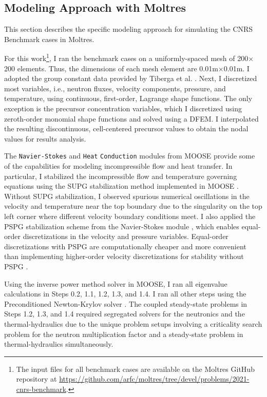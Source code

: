 \subsection{Modeling Approach with Moltres} \label{sec:model}

This section describes the specific modeling approach for
simulating the CNRS Benchmark cases in Moltres.

For this work\footnote{The input files for
all benchmark
cases are available on the Moltres GitHub repository at 
\url{https://github.com/arfc/moltres/tree/devel/problems/2021-cnrs-benchmark}.
}, I ran the benchmark cases on a uniformly-spaced mesh
of 200$\times$200 elements. Thus, the dimensions of each mesh element are
0.01m$\times$0.01m. I adopted the group constant data
provided by Tiberga et al. \cite{tiberga_results_2020}. Next, I
discretized most variables, i.e., neutron fluxes, velocity
components, pressure, and temperature, using continuous, first-order, Lagrange
shape functions. The only exception is the precursor concentration variables,
which I discretized using zeroth-order monomial shape functions and solved
using a \gls{DFEM}. I interpolated the resulting discontinuous,
cell-centered precursor values to obtain the nodal values for results
analysis.

The
\texttt{Navier-Stokes} and \texttt{Heat} \texttt{Conduction} modules from
\gls{MOOSE} \cite{giudicelli_30_2024} provide some of the capabilities for
modeling incompressible flow and heat transfer. In particular, I stabilized
the incompressible flow and temperature governing equations using the
\gls{SUPG} stabilization method implemented in \gls{MOOSE}
\cite{peterson_overview_2018}. Without \gls{SUPG} stabilization, I
observed spurious numerical oscillations in the velocity and temperature near
the top boundary due to the singularity on the top left corner where different
velocity boundary conditions meet. I also applied the \gls{PSPG} stabilization
scheme \cite{hughes_new_1986} from the Navier-Stokes module
\cite{peterson_overview_2018},
which enables equal-order discretizations in the velocity and pressure
variables. Equal-order discretizations with \gls{PSPG} are computationally
cheaper and more convenient than implementing higher-order
velocity discretizations for stability without \gls{PSPG}
\cite{chapelle_inf-sup_1993}.

Using the inverse power method solver in \gls{MOOSE}, I ran all eigenvalue calculations in
Steps 0.2, 1.1, 1.2, 1.3, and 1.4. I ran all other steps
using the Preconditioned Newton-Krylov solver
\cite{gaston_physics-based_2015}. The coupled steady-state problems in
Steps 1.2, 1.3, and 1.4 required segregated solvers for the neutronics
and the thermal-hydraulics due to the unique problem setups involving a
criticality search problem for the neutron multiplication factor
and a steady-state problem in thermal-hydraulics simultaneously.

